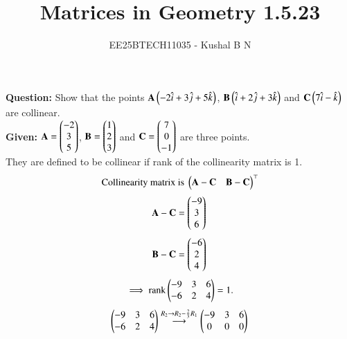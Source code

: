 \documentclass[journal,12pt,onecolumn]{IEEEtran}
\title{Matrices in Geometry 1.5.23}
\author{EE25BTECH11035 - Kushal B N}
\theoremstyle{remark}
\begin{document}
\vspace{3cm}
\maketitle
{\let\newpage\relax\maketitle}
\textbf{Question: }
Show that the points $\mathbf{A}\left(-2\hat{i}+3\hat{j}+5\hat{k}\right)$, $\mathbf{B}\left(\hat{i}+2\hat{j}+3\hat{k}\right)$ and $\mathbf{C}\left(7\hat{i}-\hat{k}\right)$ are collinear.\\

\textbf{Given: } 
$\mathbf{A}=\begin{pmatrix}-2\\3\\5\end{pmatrix}$, $\mathbf{B}=\begin{pmatrix}1\\2\\3\end{pmatrix}$ and $\mathbf{C}=\begin{pmatrix}7\\0\\-1\end{pmatrix}$ are three points.\\

They are defined to be collinear if rank of the collinearity matrix is 1.\\
\begin{align*}
    \text{Collinearity matrix is }\begin{pmatrix}\mathbf{A}- \mathbf{C} & \mathbf{B}-\mathbf{C}\end{pmatrix}^{\top}\\
\end{align*}
    \begin{equation}
    \mathbf{A}-\mathbf{C}=\begin{pmatrix}-9\\3\\6\end{pmatrix}\\
    \end{equation}
    \begin{equation}
    \mathbf{B}-\mathbf{C}=\begin{pmatrix}-6\\2\\4\end{pmatrix}\\
    \end{equation}
    \begin{equation}
    \implies \text{rank}\begin{pmatrix}-9&3&6 \\ -6&2&4\end{pmatrix} = 1.
    \end{equation}
\begin{equation}
   \begin{pmatrix}-9&3&6\\ -6&2&4\end{pmatrix}\overset{R_2 \rightarrow R_2 - \frac{2}{3}R_1}{\longrightarrow} \begin{pmatrix}-9&3&6\\0&0&0\end{pmatrix}\\
\end{equation}
   
\end{document}
